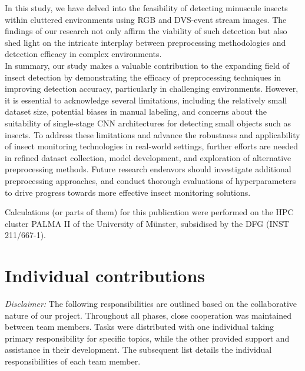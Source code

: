 \documentclass[sigchi,screen]{acmart}
\begin{document}
In this study, we have delved into the feasibility of detecting minuscule insects within cluttered environments using RGB and DVS-event stream images. The findings of our research not only affirm the viability of such detection but also shed light on the intricate interplay between preprocessing methodologies and detection efficacy in complex environments. \\
In summary, our study makes a valuable contribution to the expanding field of insect detection by demonstrating the efficacy of preprocessing techniques in improving detection accuracy, particularly in challenging environments. However, it is essential to acknowledge several limitations, including the relatively small dataset size, potential biases in manual labeling, and concerns about the suitability of single-stage CNN architectures for detecting small objects such as insects. To address these limitations and advance the robustness and applicability of insect monitoring technologies in real-world settings, further efforts are needed in refined dataset collection, model development, and exploration of alternative preprocessing methods. Future research endeavors should investigate additional preprocessing approaches, and conduct thorough evaluations of hyperparameters to drive progress towards more effective insect monitoring solutions.
\begin{acks}
  Calculations (or parts of them) for this publication were performed on the HPC cluster PALMA II of the University of Münster, subsidised by the DFG (INST 211/667-1).
\end{acks}



\appendix

\section{Individual contributions}
\textit{Disclaimer:} The following responsibilities are outlined based on the collaborative nature of our project. Throughout all phases, close cooperation was maintained between team members. Tasks were distributed with one individual taking primary responsibility for specific topics, while the other provided support and assistance in their development. The subsequent list details the individual responsibilities of each team member.  
\end{document}
